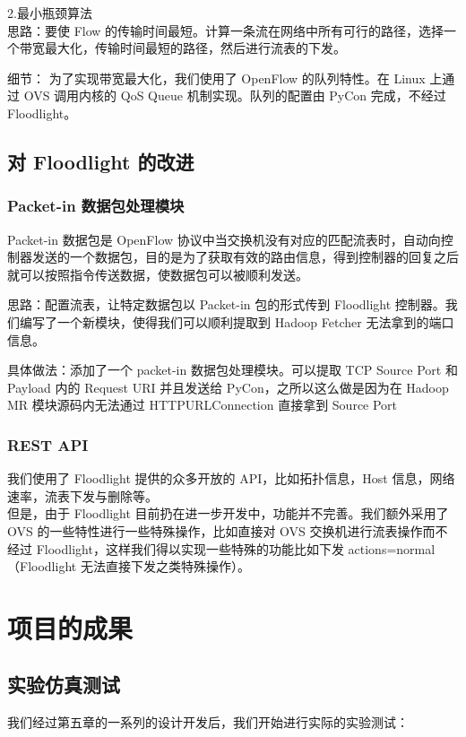 \documentclass[a4paper, 11pt]{article}                                                   %
\begin{document}
\begin{CJK*}{UTF8}{song}
2.最小瓶颈算法\\
思路：要使 Flow 的传输时间最短。计算一条流在网络中所有可行的路径，选择一个带宽最大化，传输时间最短的路径，然后进行流表的下发。

细节：
为了实现带宽最大化，我们使用了 OpenFlow 的队列特性。在 Linux 上通过 OVS 调用内核的 QoS Queue 机制实现。队列的配置由 PyCon 完成，不经过 Floodlight。
\subsection{对 Floodlight 的改进}
\subsubsection{Packet-in 数据包处理模块}
Packet-in 数据包是 OpenFlow 协议中当交换机没有对应的匹配流表时，自动向控制器发送的一个数据包，目的是为了获取有效的路由信息，得到控制器的回复之后就可以按照指令传送数据，使数据包可以被顺利发送。

思路：配置流表，让特定数据包以 Packet-in 包的形式传到 Floodlight 控制器。我们编写了一个新模块，使得我们可以顺利提取到 Hadoop Fetcher 无法拿到的端口信息。

具体做法：添加了一个 packet-in 数据包处理模块。可以提取 TCP Source Port 和 Payload 内的 Request URI 并且发送给 PyCon，之所以这么做是因为在 Hadoop MR 模块源码内无法通过 HTTPURLConnection 直接拿到 Source Port
\subsubsection{REST API}
我们使用了 Floodlight 提供的众多开放的 API，比如拓扑信息，Host 信息，网络速率，流表下发与删除等。\\
但是，由于 Floodlight 目前扔在进一步开发中，功能并不完善。我们额外采用了 OVS 的一些特性进行一些特殊操作，比如直接对 OVS 交换机进行流表操作而不经过 Floodlight，这样我们得以实现一些特殊的功能比如下发 actions=normal（Floodlight 无法直接下发之类特殊操作）。
\section{项目的成果}
\subsection{实验仿真测试}
我们经过第五章的一系列的设计开发后，我们开始进行实际的实验测试：


\end{CJK*}
\end{document}
